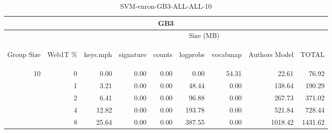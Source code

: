 \begin{center}
\begin{table}[htbp] 
 \begin{center}
\begin{tabular}{ | r | r | r | r | r | r | r | r | r |}
\hline
\multicolumn{9}{|c|}{GB3}\\
\hline
 & & \multicolumn{7}{|c|}{Size (MB)}\\ \cline{3-9}
\begin{sideways}Group Size\end{sideways} & \begin{sideways}Web1T \% \end{sideways} & \begin{sideways}keys.mph\end{sideways} & \begin{sideways}signature\end{sideways} & \begin{sideways}counts\end{sideways} & \begin{sideways}logprobs\end{sideways} & \begin{sideways}vocabmap\end{sideways} & \begin{sideways}Authors Model \end{sideways} & \begin{sideways}TOTAL\end{sideways}\\
\hline
\multirow{4}{*}{10}
 & 0 & 0.00 & 0.00 & 0.00 & 0.00 & 54.31 & 22.61 & 76.92\\ \cline{2-9}
 & 1 & 3.21 & 0.00 & 0.00 & 48.44 & 0.00 & 138.64 & 190.29\\ \cline{2-9}
 & 2 & 6.41 & 0.00 & 0.00 & 96.88 & 0.00 & 267.73 & 371.02\\ \cline{2-9}
 & 4 & 12.82 & 0.00 & 0.00 & 193.78 & 0.00 & 521.84 & 728.44\\ \cline{2-9}
 & 8 & 25.64 & 0.00 & 0.00 & 387.55 & 0.00 & 1018.42 & 1431.62\\ \cline{2-9}
\hline
\end{tabular}
\caption{SVM-enron-GB3-ALL-ALL-10}
\label{table:SVM-enron-GB3-ALL-ALL-10}
\end{center}
 \end{table}
\end{center}

